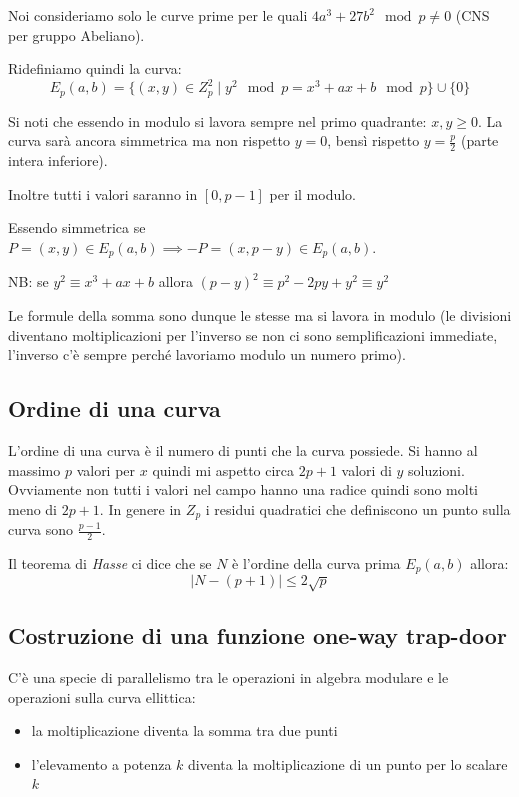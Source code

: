 \vspace{0.25cm}

Noi consideriamo solo le curve prime per le quali $4a^3 + 27b^2 \mod p \neq 0$ (CNS per gruppo Abeliano).

Ridefiniamo quindi la curva:
$$ E_p(a,b) = \{ (x,y) \in Z_p^2 \mid y^2 \mod p = x^3 + ax + b \mod p \} \cup \{0\} $$

Si noti che essendo in modulo si lavora sempre nel primo quadrante: $x, y \geq 0$.
La curva sarà ancora simmetrica ma non rispetto $y = 0$, bensì rispetto $y = \frac{p}{2}$ (parte intera inferiore).

Inoltre tutti i valori saranno in $[0, p-1]$ per il modulo.

Essendo simmetrica se $P=(x,y) \in E_p(a,b) \implies -P = (x, p-y) \in E_p(a, b)$.

NB: se $y^2 \equiv x^3 + ax + b$ allora $(p-y)^2 \equiv p^2 -2py + y^2 \equiv y^2$

Le formule della somma sono dunque le stesse ma si lavora in modulo (le divisioni diventano moltiplicazioni per l'inverso se non ci sono semplificazioni immediate, l'inverso c'è sempre perché lavoriamo modulo un numero primo).

\subsection{Ordine di una curva}
L'ordine di una curva è il numero di punti che la curva possiede.
Si hanno al massimo $p$ valori per $x$ quindi mi aspetto circa $2p + 1$ valori di $y$ soluzioni.
Ovviamente non tutti i valori nel campo hanno una radice quindi sono molti meno di $2p + 1$.
In genere in $Z_p$ i residui quadratici che definiscono un punto sulla curva sono $\frac{p-1}{2}$.

Il teorema di \emph{Hasse} ci dice che se $N$ è l'ordine della curva prima $E_p(a,b)$ allora:
$$ \mid N - (p+1) \mid \leq 2\sqrt{p}  $$

\subsection{Costruzione di una funzione one-way trap-door}
C'è una specie di parallelismo tra le operazioni in algebra modulare e le operazioni sulla curva ellittica:
\begin{itemize}
    \item la moltiplicazione diventa la somma tra due punti
    \item l'elevamento a potenza $k$ diventa la moltiplicazione di un punto per lo scalare $k$
\end{itemize}

